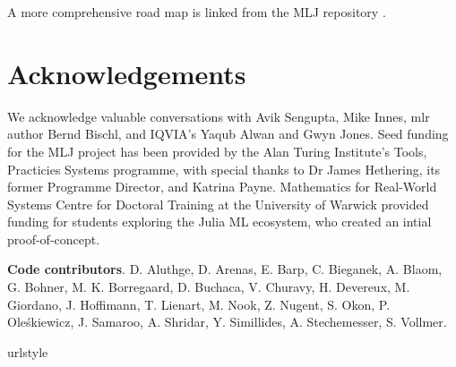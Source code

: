 \documentclass{article}
\begin{document}
A more comprehensive road map is linked from the MLJ repository \cite{MLJ}.

\section*{Acknowledgements}

We acknowledge valuable conversations with Avik Sengupta, Mike Innes, mlr author Bernd Bischl, and IQVIA's Yaqub Alwan and Gwyn Jones. Seed funding for the MLJ project has been provided by the Alan Turing Institute's Tools, Practicies Systems programme, with special thanks to Dr James Hethering, its former Programme Director, and Katrina Payne. Mathematics for Real-World Systems Centre for Doctoral Training at the University of Warwick provided funding for students exploring the Julia ML ecosystem, who created an intial proof-of-concept.

\textbf{Code contributors}. D. Aluthge, D. Arenas, E. Barp, C. Bieganek, A. Blaom, G. Bohner, M. K. Borregaard, D. Buchaca, V. Churavy, H. Devereux, M. Giordano, J. Hoffimann, T. Lienart, M. Nook, Z. Nugent, S. Okon, P. Oleśkiewicz, J. Samaroo, A. Shridar, Y. Simillides, A. Stechemesser, S. Vollmer.



\providecommand{\natexlab}[1]{#1}
\providecommand{\url}[1]{\texttt{#1}}
\expandafter\ifx\csname urlstyle\endcsname\relax
  \providecommand{\doi}[1]{doi: #1}\else
  \providecommand{\doi}{doi: \begingroup \urlstyle{rm}\Url}\fi
\end{document}
